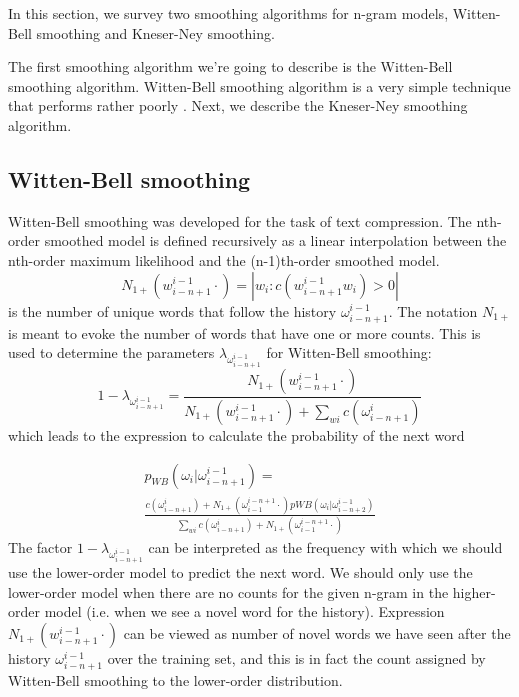 \documentclass[10pt, a4paper]{article}
\begin{document}
In this section, we survey two smoothing algorithms for n-gram models, Witten-Bell smoothing and Kneser-Ney smoothing. 

The first smoothing algorithm we\rq{}re going to describe is the Witten-Bell smoothing algorithm. Witten-Bell smoothing algorithm is a very simple technique that performs rather poorly \cite{1_chen1999empirical}. Next, we describe the Kneser-Ney smoothing algorithm. 

\subsection{Witten-Bell smoothing}
Witten-Bell smoothing was developed for the task of text compression. The nth-order smoothed model is defined recursively as a linear interpolation between the nth-order maximum likelihood and the (n-1)th-order smoothed model. 
\begin{equation}
N_{1+}(w_{i-n+1}^{i-1}\cdot) = |{w_{i} : c(w_{i-n+1}^{i-1}w_{i}) > 0}|
\end{equation}
is the number of unique words that follow the history $ \omega_{i-n+1}^{i-1} $.
The notation $N_{1+}$ is meant to evoke the number of words that have one or more counts.
This is used to determine the parameters $ \lambda_{\omega_{i-n+1}^{i-1}} $  for Witten-Bell smoothing:
\begin{equation}
1-\lambda_{\omega_{i-n+1}^{i-1}}=\frac{N_{1+}(w_{i-n+1}^{i-1}\cdot)}{N_{1+}(w_{i-n+1}^{i-1}\cdot) + \sum_{wi}c(\omega_{i-n+1}^{i})}
\end{equation}
which leads to the expression to calculate the probability of the next word 

\begin{multline}
p_{WB}(\omega_i|\omega_{i-n+1}^{i-1})= \\ \frac{c(\omega_{i-n+1}^{i}) + N_{1+}(\omega_{i-1}^{i-n+1}\cdot)p{WB}(\omega_i|\omega_{i-n+2}^{i-1})}{\sum_{wi}c(\omega_{i-n+1}^{i}) + N_{1+}(\omega_{i-1}^{i-n+1}\cdot)}
\end{multline}
The factor $ 1-\lambda_{\omega_{i-n+1}^{i-1}} $ can be interpreted as the frequency with which we should use the lower-order model to predict the next word. We should only use the lower-order model when there are no counts for the given n-gram in the higher-order model (i.e. when we see a novel word for the history). Expression $ N_{1+}(w_{i-n+1}^{i-1}\cdot) $ can be viewed as number of novel words we have seen after the history $ \omega_{i-n+1}^{i-1} $ over the training set, and this is in fact the count assigned by Witten-Bell smoothing to the lower-order distribution.
\end{document}
